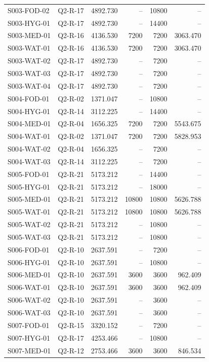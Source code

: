 \documentclass[withoutpreface,colorprint]{format}
\numberwithin{equation}{section}
\numberwithin{figure}{section}
\numberwithin{table}{section}
\begin{document}
\begin{longtable}{@{}llrrrr@{}}
S003-FOD-02 & Q2-R-17 & 4892.730 & -- & 10800 & --\\
S003-HYG-01 & Q2-R-17 & 4892.730 & -- & 14400 & --\\
S003-MED-01 & Q2-R-16 & 4136.530 & 7200 & 7200 & 3063.470\\
S003-WAT-01 & Q2-R-16 & 4136.530 & 7200 & 7200 & 3063.470\\
S003-WAT-02 & Q2-R-17 & 4892.730 & -- & 7200 & --\\
S003-WAT-03 & Q2-R-17 & 4892.730 & -- & 7200 & --\\
S003-WAT-04 & Q2-R-17 & 4892.730 & -- & 7200 & --\\
S004-FOD-01 & Q2-R-02 & 1371.047 & -- & 10800 & --\\
S004-HYG-01 & Q2-R-14 & 3112.225 & -- & 14400 & --\\
S004-MED-01 & Q2-R-04 & 1656.325 & 7200 & 7200 & 5543.675\\
S004-WAT-01 & Q2-R-02 & 1371.047 & 7200 & 7200 & 5828.953\\
S004-WAT-02 & Q2-R-04 & 1656.325 & -- & 7200 & --\\
S004-WAT-03 & Q2-R-14 & 3112.225 & -- & 7200 & --\\
S005-FOD-01 & Q2-R-21 & 5173.212 & -- & 14400 & --\\
S005-HYG-01 & Q2-R-21 & 5173.212 & -- & 18000 & --\\
S005-MED-01 & Q2-R-21 & 5173.212 & 10800 & 10800 & 5626.788\\
S005-WAT-01 & Q2-R-21 & 5173.212 & 10800 & 10800 & 5626.788\\
S005-WAT-02 & Q2-R-21 & 5173.212 & -- & 10800 & --\\
S005-WAT-03 & Q2-R-21 & 5173.212 & -- & 10800 & --\\
S006-FOD-01 & Q2-R-10 & 2637.591 & -- & 7200 & --\\
S006-HYG-01 & Q2-R-10 & 2637.591 & -- & 10800 & --\\
S006-MED-01 & Q2-R-10 & 2637.591 & 3600 & 3600 & 962.409\\
S006-WAT-01 & Q2-R-10 & 2637.591 & 3600 & 3600 & 962.409\\
S006-WAT-02 & Q2-R-10 & 2637.591 & -- & 3600 & --\\
S006-WAT-03 & Q2-R-10 & 2637.591 & -- & 3600 & --\\
S007-FOD-01 & Q2-R-15 & 3320.152 & -- & 7200 & --\\
S007-HYG-01 & Q2-R-17 & 4253.466 & -- & 10800 & --\\
S007-MED-01 & Q2-R-12 & 2753.466 & 3600 & 3600 & 846.534\\

\end{longtable}
\end{document}

